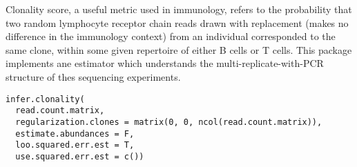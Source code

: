 \documentclass[letterpaper]{book}
\begin{document}
%
\begin{SeeAlso}\relax
{}
\end{SeeAlso}
%
\begin{Examples}
\end{Examples}
%
\begin{Description}\relax
Clonality score, a useful metric used in immunology, refers to the probability that two random lymphocyte receptor chain reads drawn with replacement (makes no difference in the immunology context) from an individual corresponded to the same clone, within some given repertoire of either B cells or T cells.  This package implements ane estimator which understands the multi-replicate-with-PCR structure of thes sequencing experiments.
\end{Description}
%
\begin{Usage}
\begin{verbatim}
infer.clonality(
  read.count.matrix, 
  regularization.clones = matrix(0, 0, ncol(read.count.matrix)),
  estimate.abundances = F,
  loo.squared.err.est = T,
  use.squared.err.est = c())
\end{verbatim}
\end{Usage}
%
\end{document}
